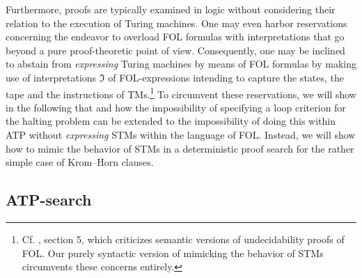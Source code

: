 \documentclass[%
  manuscript=article,   %
  year=2024,
  volume=77,
  doi=10.59203/zfn.77.694,
]{zfn}
\begin{document}
Furthermore, proofs are typically examined in logic without considering their relation to the execution of Turing machines. One may even harbor reservations concerning the endeavor to overload FOL formulas with interpretations that go beyond a pure proof-theoretic point of view. Consequently, one may be inclined to abstain from \emph{expressing} Turing machines by means of FOL formulas by making use of interpretations $\Im$ of FOL-expressions intending to capture the states, the tape and the instructions of TMs.\footnote{Cf. \parencite{Lampert2}, section 5, which criticizes semantic versions of undecidability proofs of FOL. Our purely syntactic version of mimicking the behavior of STMs circumvents these concerns entirely.} To circumvent these reservations, we will show in the following that and how the impossibility of specifying a loop criterion for the halting problem can be extended to the impossibility of doing this within ATP without \emph{expressing} STMs within the language of FOL. Instead, we will show how to mimic the behavior of STMs in a deterministic proof search for the rather simple case of Krom--Horn clauses. %

\subsection{ATP-search}\label{tableauxsec}
\end{document}
